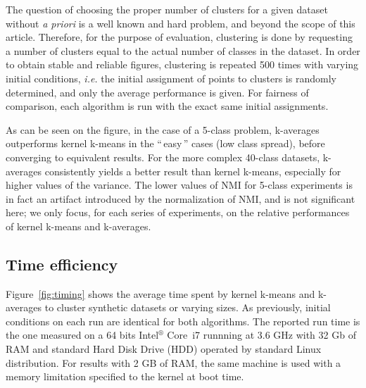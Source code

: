 \documentclass[10pt,journal,compsoc]{IEEEtran}
\newcommand{\gl}[1]{``\,#1\,''} %
\begin{document}
The question of choosing the proper number of clusters for a given dataset without \textit{a priori} is a well known and hard problem, and beyond the scope of this article. Therefore, for the purpose of evaluation, clustering is done by requesting a number of clusters equal to the actual number of classes in the dataset. In order to obtain stable and reliable figures, clustering is repeated 500 times with varying initial conditions, \textit{i.e.} the initial assignment of points to clusters is randomly determined, and only the average performance is given. For fairness of comparison, each algorithm is run with the exact same initial assignments.

As can be seen on the figure, in the case of a 5-class problem, k-averages outperforms kernel k-means in the \gl{easy} cases (low class spread), before converging to equivalent results. For the more complex 40-class datasets, k-averages consistently yields a better result than kernel k-means, especially for higher values of the variance. The lower values of NMI for 5-class experiments is in fact an artifact introduced by the normalization of NMI, and is not significant here; we only focus, for each series of experiments, on the relative performances of kernel k-means and k-averages.

\subsection{Time efficiency}

Figure~\ref{fig:timing} shows the average time spent by kernel k-means and k-averages to cluster synthetic datasets or varying sizes. As previously, initial conditions on each run are identical for both algorithms. The reported run time is the one measured on a 64 bits Intel$^\circledR$ Core\texttrademark   \, i7 runnning at 3.6 GHz with 32 Gb of RAM and standard Hard Disk Drive (HDD)  operated by standard Linux distribution. For results with 2 GB of RAM, the same machine is used with a memory limitation specified to the kernel at boot time.
\end{document}
